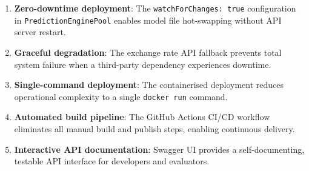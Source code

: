 \begin{enumerate}
  \item \textbf{Zero-downtime deployment}: The \texttt{watchForChanges: true} configuration in \texttt{PredictionEnginePool} enables model file hot-swapping without API server restart.
  \item \textbf{Graceful degradation}: The exchange rate API fallback prevents total system failure when a third-party dependency experiences downtime.
  \item \textbf{Single-command deployment}: The containerised deployment reduces operational complexity to a single \texttt{docker run} command.
  \item \textbf{Automated build pipeline}: The GitHub Actions CI/CD workflow eliminates all manual build and publish steps, enabling continuous delivery.
  \item \textbf{Interactive API documentation}: Swagger UI provides a self-documenting, testable API interface for developers and evaluators.
\end{enumerate}

\newpage
